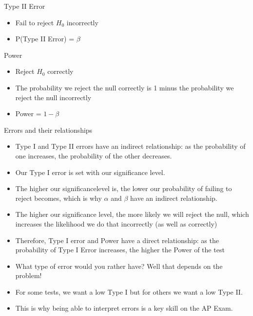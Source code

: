\documentclass[../stats.tex]{subfiles}
\begin{document}
Type II Error 
\begin{itemize}
    \item Fail to reject $H_0$ incorrectly 
    \item P(Type II Error) = $\beta$
\end{itemize}

Power 
\begin{itemize}
    \item Reject $H_0$ correctly 
    \item The probability we reject the null correctly is 1 minus the probability we reject the null incorrectly
    \item Power = $1-\beta$
\end{itemize}

Errors and their relationships 
\begin{itemize}
    \item Type I and Type II errors have an indirect relationship: as the probability of one increases, the probability of the other decreases.
    \item Our Type I error is set with our significance level.
    \item The higher our significancelevel is, the lower our probability of failing to reject becomes, which is why $\alpha$ and $\beta$ have an indirect relationship.
    \item The higher our significance level, the more likely we will reject the null, which increases the likelihood we do that incorrectly (as well as correctly)
    \item Therefore, Type I error and Power have a direct relationship: as the probability of Type I Error increases, the higher the Power of the test
\end{itemize}

\begin{itemize}
    \item What type of error would you rather have? Well that depends on the problem!
    \item For some tests, we want a low Type I but for others we want a low Type II.
    \item This is why being able to interpret errors is a key skill on the AP Exam.
\end{itemize}
\end{document}
